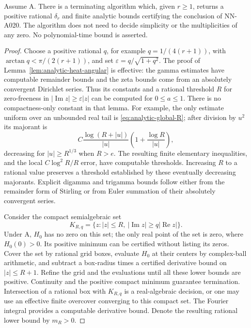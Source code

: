 \begin{corollary}
Assume A. There is a terminating algorithm which, given $r\ge1$,
returns a positive rational $\delta_r$ and finite analytic bounds
certifying the conclusion of NN-A020. The algorithm does not
need to decide simplicity or the multiplicities of any zero.
No polynomial-time bound is asserted.
\end{corollary}

\begin{proof}
Choose a positive rational $q$, for example $q=1/(4(r+1))$, with
$\arctan q<\pi/(2(r+1))$, and set
$\varepsilon=q/\sqrt{1+q^2}$. The proof of
Lemma~\ref{lem:analytic-heat-angular} is effective: the gamma
estimates have computable remainder bounds and the zeta bounds
come from an absolutely convergent Dirichlet series. Thus its
constants and a rational threshold $R$ for zero-freeness in
$|\operatorname{Im}z|\ge\varepsilon|z|$ can be computed for
$0\le a\le1$. There is no compactness-only constant in that lemma.
For example, the only estimate uniform over an unbounded real
tail is \eqref{eq:analytic-global-R}; after division by $u^2$ its
majorant is
\[
 C\frac{\log(R+|u|)}{|u|}
          \left(1+\frac{\log R}{|u|}\right),
\]
decreasing for $|u|\ge R^{1/3}$ when $R>e$.
The resulting finite elementary inequalities, and the local
$C\log^2R/R$ error, have computable thresholds. Increasing $R$
to a rational value preserves a threshold established by these
eventually decreasing majorants. Explicit digamma and trigamma
bounds follow either from the remainder form of Stirling or
from Euler summation of their absolutely convergent series.

Consider the compact semialgebraic set
\[
 K_{R,q}=\{z:|z|\le R,\ |\operatorname{Im}z|
                                \ge q|\operatorname{Re}z|\}.
\]
Under A, $H_0$ has no zero on this set; the only real point of the
set is zero, where $H_0(0)>0$. Its positive minimum can be
certified without listing its zeros. Cover the set by rational
grid boxes, evaluate $H_0$ at their centers by complex-ball
arithmetic, and subtract a box-radius times a certified derivative
bound on $|z|\le R+1$. Refine the grid and the evaluations until
all these lower bounds are positive. Continuity and the positive
compact minimum guarantee termination. Intersection of a rational
box with $K_{R,q}$ is a real-algebraic decision, or one may use
an effective finite overcover converging to this compact set.
The Fourier integral provides a computable derivative bound.
Denote the resulting rational lower bound by $m_R>0$.


\end{proof}
